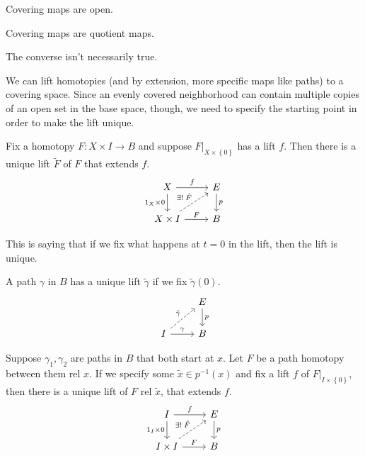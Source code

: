 \documentclass[twoside,10pt]{report}
\begin{document}
\begin{prop}
Covering maps are open.
\end{prop}

\begin{cor}
Covering maps are quotient maps.
\end{cor}
{\color{red}The converse isn't necessarily true.}

We can lift homotopies (and by extension, more specific maps like paths) to a covering space. Since an evenly covered neighborhood can contain multiple copies of an open set in the base space, though, we need to specify the starting point in order to make the lift unique.

\begin{thrm}
	Fix a homotopy $F:X \times I\to B$ and suppose $F|_{X \times \left\{ 0 \right\}}$ has a lift $f$. Then there is a unique lift $\tilde{F}$ of $F$ that extends $f$.
\[
\begin{tikzcd}
	X\rar{f}\arrow[d,"1_{X}\times 0"']&E\dar{p}\\
	X\times I\rar{F}\arrow[ur,dashed,"\exists ! \; \tilde{F}"]&B
\end{tikzcd}
\] 
\end{thrm}
This is saying that if we fix what happens at $t=0$ in the lift, then the lift is unique.

\begin{cor}
	A path $\gamma$ in $B$ has a unique lift $\tilde{\gamma}$ if we fix $\tilde{\gamma}(0)$.
	\[
	\begin{tikzcd}
		&E\dar{p}\\
		I\arrow[ur,dashed,"\tilde{\gamma}"]\rar{\gamma}&B
	\end{tikzcd}
	\] 
\end{cor}

\begin{cor}
	Suppose $\gamma_1,\gamma_2$ are paths in $B$ that both start at $x$. Let $F$ be a path homotopy between them rel $x$. If we specify some $\tilde{x} \in p^{-1}(x)$ and fix a lift $f$ of $F|_{I \times \left\{ 0 \right\}}$, then there is a unique lift of $F$ rel $\tilde{x}$, that extends $f$.
	\[
	\begin{tikzcd}
		I\arrow[d,"1_{I}\times 0"']\rar{f}&E\dar{p}\\
		I\times I\rar{F}\arrow[ur,dashed,"\exists ! \; \tilde{F}"]&B
	\end{tikzcd}
	\] 
\end{cor}
\end{document}
